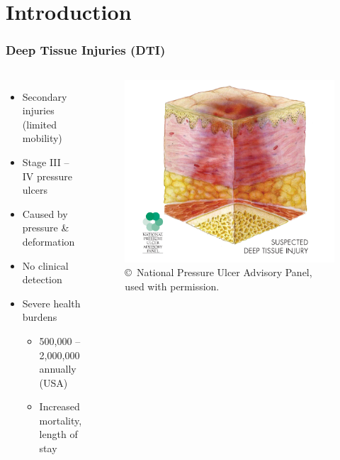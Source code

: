 \documentclass{beamer}
\begin{document}
	\section{Introduction}
		\begin{frame}
			\frametitle{Deep Tissue Injuries (DTI)}
			\begin{columns}[c]
				\begin{itemize}
					\item Secondary injuries (limited mobility)
					\item Stage III -- IV pressure ulcers
					\item Caused by pressure \& deformation
					\item No clinical detection
					\item Severe health burdens \cite{russo08}
					\begin{itemize}
						\item 500,000 -- 2,000,000 annually (USA)
						\item Increased mortality, length of stay
					\end{itemize}
				\end{itemize}

					\begin{figure}
						\centering
						\includegraphics[width=\textwidth]{assets/npuap/suspectedDTI.png}
						\caption{\fontsize{6}{4}\selectfont \copyright\ National Pressure Ulcer Advisory Panel, used with permission.}
					\end{figure}
			\end{columns}
		\end{frame}
\end{document}
